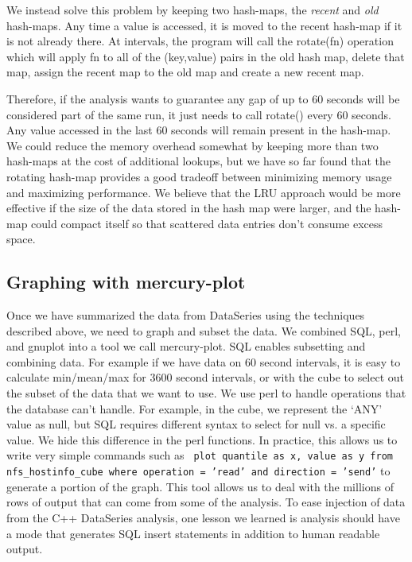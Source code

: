 We instead solve this problem by keeping two hash-maps, the {\it
recent} and {\it old} hash-maps.  Any time a value is accessed, it is
moved to the recent hash-map if it is not already there.  At intervals, 
the program will call the rotate(fn) operation which will apply
fn to all of the (key,value) pairs in the old hash map, delete that map,
assign the recent map to the old map and create a new recent map.

Therefore, if the analysis wants to guarantee any gap of up to 60
seconds will be considered part of the same run, it just needs to call
rotate() every 60 seconds.  Any value accessed in the last 60 seconds
will remain present in the hash-map.  We could reduce the memory
overhead somewhat by keeping more than two hash-maps at the cost of
additional lookups, but we have so far found that the rotating
hash-map provides a good tradeoff between minimizing memory usage and
maximizing performance.  We believe that the LRU approach would be
more effective if the size of the data stored in the hash map were
larger, and the hash-map could compact itself so that scattered
data entries don't consume excess space.

\subsection{Graphing with mercury-plot}

Once we have summarized the data from DataSeries using the techniques
described above, we need to graph and subset the data.  We combined
SQL, perl, and gnuplot into a tool we call mercury-plot.
 SQL enables subsetting
and combining data. For example if we have data on 60 second
intervals, it is easy to calculate min/mean/max for 3600 second
intervals, or with the cube to select out the subset of the data that
we want to use.  We use perl to handle operations that the database
can't handle. For example, in the cube, we represent the `ANY' value
as null, but SQL requires different syntax to select for null vs. a
specific value.  We hide this difference in the perl functions.  In
practice, this allows us to write very simple commands such as {\tt
plot quantile as x, value as y from nfs\_hostinfo\_cube where
operation = 'read' and direction = 'send'} to generate a portion of
the graph.  This tool allows us to deal with the millions of rows of
output that can come from some of the analysis.  To ease injection 
of data from the C++ DataSeries analysis, one lesson we learned is
analysis should have a mode that generates SQL insert statements in
addition to human readable output.
